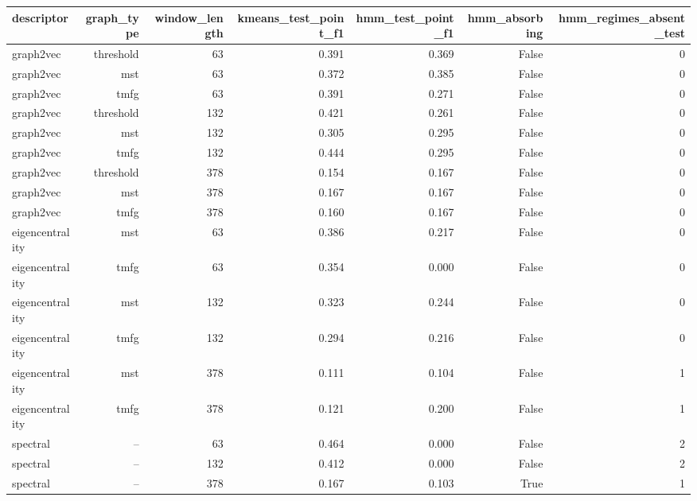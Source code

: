 \begin{tabular}{lrrrrrr}
\toprule
descriptor & graph\_type & window\_length & kmeans\_test\_point\_f1 & hmm\_test\_point\_f1 & hmm\_absorbing & hmm\_regimes\_absent\_test \\
\midrule
graph2vec & threshold & 63 & 0.391 & 0.369 & False & 0 \\
graph2vec & mst & 63 & 0.372 & 0.385 & False & 0 \\
graph2vec & tmfg & 63 & 0.391 & 0.271 & False & 0 \\
graph2vec & threshold & 132 & 0.421 & 0.261 & False & 0 \\
graph2vec & mst & 132 & 0.305 & 0.295 & False & 0 \\
graph2vec & tmfg & 132 & 0.444 & 0.295 & False & 0 \\
graph2vec & threshold & 378 & 0.154 & 0.167 & False & 0 \\
graph2vec & mst & 378 & 0.167 & 0.167 & False & 0 \\
graph2vec & tmfg & 378 & 0.160 & 0.167 & False & 0 \\
eigencentrality & mst & 63 & 0.386 & 0.217 & False & 0 \\
eigencentrality & tmfg & 63 & 0.354 & 0.000 & False & 0 \\
eigencentrality & mst & 132 & 0.323 & 0.244 & False & 0 \\
eigencentrality & tmfg & 132 & 0.294 & 0.216 & False & 0 \\
eigencentrality & mst & 378 & 0.111 & 0.104 & False & 1 \\
eigencentrality & tmfg & 378 & 0.121 & 0.200 & False & 1 \\
spectral & -- & 63 & 0.464 & 0.000 & False & 2 \\
spectral & -- & 132 & 0.412 & 0.000 & False & 2 \\
spectral & -- & 378 & 0.167 & 0.103 & True & 1 \\
\bottomrule
\end{tabular}
